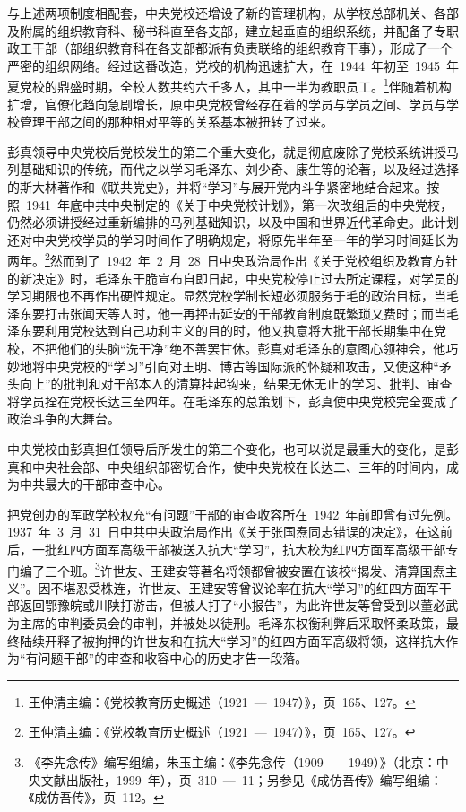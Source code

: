 与上述两项制度相配套，中央党校还增设了新的管理机构，从学校总部机关、各部及附属的组织教育科、秘书科直至各支部，建立起垂直的组织系统，并配备了专职政工干部（部组织教育科在各支部都派有负责联络的组织教育干事），形成了一个严密的组织网络。经过这番改造，党校的机构迅速扩大，在~1944~年初至~1945~年夏党校的鼎盛时期，全校人数共约六千多人，其中一半为教职员工。\footnote{王仲清主编：《党校教育历史概述（1921~—~1947）》，页~165、127。}伴随着机构扩增，官僚化趋向急剧增长，原中央党校曾经存在着的学员与学员之间、学员与学校管理干部之间的那种相对平等的关系基本被扭转了过来。

彭真领导中央党校后党校发生的第二个重大变化，就是彻底废除了党校系统讲授马列基础知识的传统，而代之以学习毛泽东、刘少奇、康生等的论著，以及经过选择的斯大林著作和《联共党史》，并将“学习”与展开党内斗争紧密地结合起来。按照~1941~年底中共中央制定的《关于中央党校计划》，第一次改组后的中央党校，仍然必须讲授经过重新编排的马列基础知识，以及中国和世界近代革命史。此计划还对中央党校学员的学习时间作了明确规定，将原先半年至一年的学习时间延长为两年。\footnote{王仲清主编：《党校教育历史概述（1921~—~1947）》，页~165、127。}然而到了~1942~年~2~月~28~日中央政治局作出《关于党校组织及教育方针的新决定》时，毛泽东干脆宣布自即日起，中央党校停止过去所定课程，对学员的学习期限也不再作出硬性规定。显然党校学制长短必须服务于毛的政治目标，当毛泽东要打击张闻天等人时，他一再抨击延安的干部教育制度既繁琐又费时；而当毛泽东要利用党校达到自己功利主义的目的时，他又执意将大批干部长期集中在党校，不把他们的头脑“洗干净”绝不善罢甘休。彭真对毛泽东的意图心领神会，他巧妙地将中央党校的“学习”引向对王明、博古等国际派的怀疑和攻击，又使这种“矛头向上”的批判和对干部本人的清算挂起钩来，结果无休无止的学习、批判、审查将学员拴在党校长达三至四年。在毛泽东的总策划下，彭真使中央党校完全变成了政治斗争的大舞台。

中央党校由彭真担任领导后所发生的第三个变化，也可以说是最重大的变化，是彭真和中央社会部、中央组织部密切合作，使中央党校在长达二、三年的时间内，成为中共最大的干部审查中心。

把党创办的军政学校权充“有问题”干部的审查收容所在~1942~年前即曾有过先例。1937~年~3~月~31~日中共中央政治局作出《关于张国焘同志错误的决定》，在这前后，一批红四方面军高级干部被送入抗大“学习”，抗大校为红四方面军高级干部专门编了三个班。\footnote{《李先念传》编写组编，朱玉主编：《李先念传（1909~—~1949）》（北京：中央文献出版社，1999~年），页~310~—~11；另参见《成仿吾传》编写组编：《成仿吾传》，页~112。}许世友、王建安等著名将领都曾被安置在该校“揭发、清算国焘主义”。因不堪忍受株连，许世友、王建安等曾议论率在抗大“学习”的红四方面军干部返回鄂豫皖或川陕打游击，但被人打了“小报告”，为此许世友等曾受到以董必武为主席的审判委员会的审判，并被处以徒刑。毛泽东权衡利弊后采取怀柔政策，最终陆续开释了被拘押的许世友和在抗大“学习”的红四方面军高级将领，这样抗大作为“有问题干部”的审查和收容中心的历史才告一段落。

